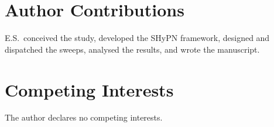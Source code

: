 \documentclass[10pt,letterpaper]{article}
\begin{document}
\section*{Author Contributions}

E.S.\ conceived the study, developed the SHyPN framework, designed and dispatched the sweeps, analysed the results, and wrote the manuscript.

\section*{Competing Interests}

The author declares no competing interests.



\end{document}
